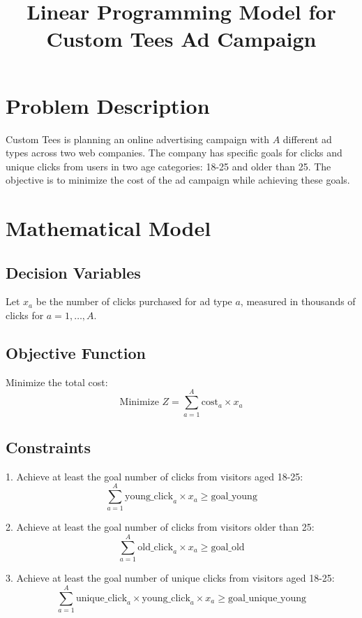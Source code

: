 \documentclass{article}
\begin{document}
\title{Linear Programming Model for Custom Tees Ad Campaign}
\author{}
\date{}
\maketitle

\section{Problem Description}

Custom Tees is planning an online advertising campaign with \( A \) different ad types across two web companies. The company has specific goals for clicks and unique clicks from users in two age categories: 18-25 and older than 25. The objective is to minimize the cost of the ad campaign while achieving these goals.

\section{Mathematical Model}

\subsection{Decision Variables}
Let \( x_a \) be the number of clicks purchased for ad type \( a \), measured in thousands of clicks for \( a = 1, \ldots, A \).

\subsection{Objective Function}
Minimize the total cost:
\[
\text{Minimize } Z = \sum_{a=1}^{A} \text{cost}_a \times x_a
\]

\subsection{Constraints}

1. Achieve at least the goal number of clicks from visitors aged 18-25:
   \[
   \sum_{a=1}^{A} \text{young\_click}_a \times x_a \geq \text{goal\_young}
   \]

2. Achieve at least the goal number of clicks from visitors older than 25:
   \[
   \sum_{a=1}^{A} \text{old\_click}_a \times x_a \geq \text{goal\_old}
   \]

3. Achieve at least the goal number of unique clicks from visitors aged 18-25:
   \[
   \sum_{a=1}^{A} \text{unique\_click}_a \times \text{young\_click}_a \times x_a \geq \text{goal\_unique\_young}
   \]
\end{document}
